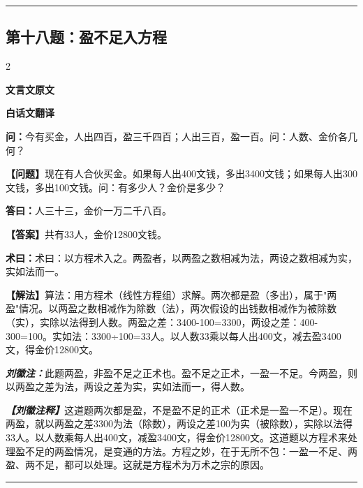 \documentclass[10pt,a4paper]{article}
\newcommand{\wen}[1]{\textbf{\color{problemcolor}问：}#1\par}
\newcommand{\da}[1]{\textbf{答曰：}#1\par}
\newcommand{\shu}[1]{\textbf{术曰：}#1\par}
\newcommand{\liuhui}[1]{{\color{commentarycolor}\textit{\textbf{刘徽注：}}#1\par}}
\newcommand{\classicalheader}[1]{{\centering\large\bfseries\color{classicalcolor} #1\par\vspace{0.5em}}}
\newcommand{\wenmodern}[1]{\textbf{\color{moderncolor}【问题】}#1\par}
\newcommand{\damodern}[1]{\textbf{【答案】}#1\par}
\newcommand{\shumodern}[1]{\textbf{【解法】}#1\par}
\newcommand{\liuhuimodern}[1]{{\color{commentarycolor}\textit{\textbf{【刘徽注释】}}#1\par}}
\newcommand{\modernheader}[1]{{\centering\large\bfseries\color{moderncolor} #1\par\vspace{0.5em}}}
\newcommand{\problemsec}[1]{\subsection*{#1}}
\begin{document}
\vspace{0.3cm}
\hrule
\vspace{0.3cm}

\problemsec{第十八题：盈不足入方程}
\begin{paracol}{2}
\classicalheader{文言文原文}
\switchcolumn
\modernheader{白话文翻译}
\switchcolumn*

\wen{今有买金，人出四百，盈三千四百；人出三百，盈一百。问：人数、金价各几何？}

\switchcolumn

\wenmodern{现在有人合伙买金。如果每人出400文钱，多出3400文钱；如果每人出300文钱，多出100文钱。问：有多少人？金价是多少？}

\switchcolumn*

\da{人三十三，金价一万二千八百。}

\switchcolumn

\damodern{共有33人，金价12800文钱。}

\switchcolumn*

\shu{术曰：以方程术入之。两盈者，以两盈之数相减为法，两设之数相减为实，实如法而一。}

\switchcolumn

\shumodern{算法：用方程术（线性方程组）求解。两次都是盈（多出），属于"两盈"情况。以两盈之数相减作为除数（法），两次假设的出钱数相减作为被除数（实），实除以法得到人数。两盈之差：3400-100=3300，两设之差：400-300=100。实如法：3300÷100=33人。以人数33乘以每人出400文，减去盈3400文，得金价12800文。}

\switchcolumn*

\liuhui{此题两盈，非盈不足之正术也。盈不足之正术，一盈一不足。今两盈，则以两盈之差为法，两设之差为实，实如法而一，得人数。}

\switchcolumn

\liuhuimodern{这道题两次都是盈，不是盈不足的正术（正术是一盈一不足）。现在两盈，就以两盈之差3300为法（除数），两设之差100为实（被除数），实除以法得33人。以人数乘每人出400文，减盈3400文，得金价12800文。这道题以方程术来处理盈不足的两盈情况，是变通的方法。方程之妙，在于无所不包：一盈一不足、两盈、两不足，都可以处理。这就是方程术为万术之宗的原因。}

\end{paracol}

\vspace{0.3cm}
\hrule
\vspace{0.3cm}
\end{document}
